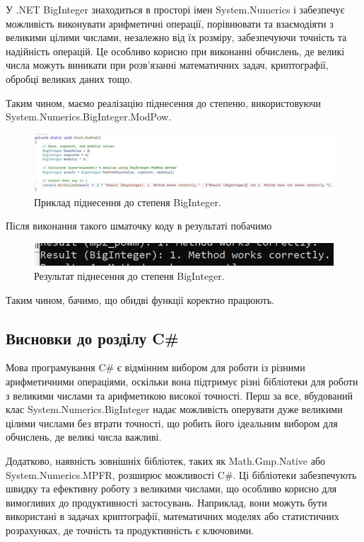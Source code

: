 У .NET BigInteger знаходиться в просторі імен System.Numerics і забезпечує можливість виконувати арифметичні операції, порівнювати та взаємодіяти з великими цілими числами, незалежно від їх розміру, забезпечуючи точність та надійність операцій. Це особливо корисно при виконанні обчислень, де великі числа можуть виникати при розв'язанні математичних задач, криптографії, обробці великих даних тощо.

Таким чином, маємо реалізацію піднесення до степеню, використовуючи System.Numerics.BigInteger.ModPow.

\begin{figure}[!h]
     \centering
     \includegraphics[scale = 1]{../IMAGES/image_03_c_sharp_lab_03.jpg}
     \caption{Приклад піднесення до степеня BigInteger.}
     \label{fig_03:}
\end{figure}

Після виконання такого шматочку коду в результаті побачимо

\begin{figure}[!h]
     \centering
     \includegraphics[scale = 1]{../IMAGES/image_04_c_sharp_lab_04.jpg}
     \caption{Результат піднесення до степеня BigInteger.}
     \label{fig_04:}
\end{figure}

Таким чином, бачимо, що обидві функції коректно працюють.


\subsection{Висновки до розділу C\#}

Мова програмування C\# є відмінним вибором для роботи із різними арифметичними операціями, оскільки вона підтримує різні бібліотеки для роботи з великими числами та арифметикою високої точності. Перш за все, вбудований клас System.Numerics.BigInteger надає можливість оперувати дуже великими цілими числами без втрати точності, що робить його ідеальним вибором для обчислень, де великі числа важливі.

Додатково, наявність зовнішніх бібліотек, таких як Math.Gmp.Native або System.Numerics.MPFR, розширює можливості C\#. Ці бібліотеки забезпечують швидку та ефективну роботу з великими числами, що особливо корисно для вимогливих до продуктивності застосувань. Наприклад, вони можуть бути використані в задачах криптографії, математичних моделях або статистичних розрахунках, де точність та продуктивність є ключовими.


